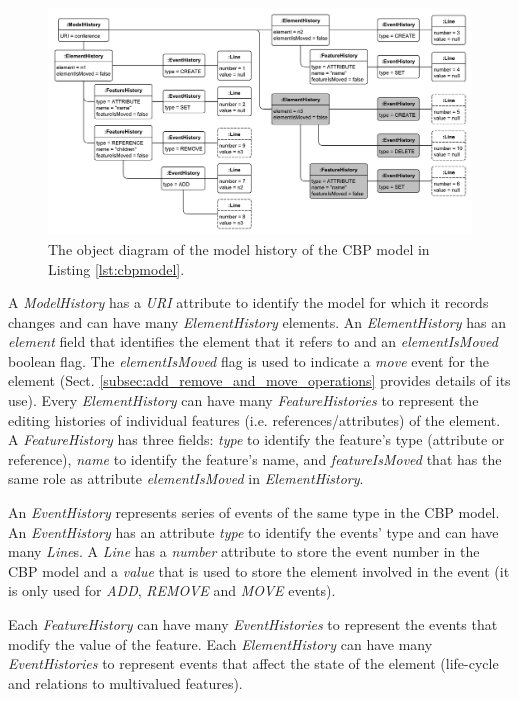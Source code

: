 \documentclass[12pt, a4paper]{report} \usepackage[titletoc]{appendix}
\begin{document}
\begin{figure}[ht]
	\centering
	\includegraphics[width=\linewidth]{history_structure}
	\caption{The object diagram of the model history of the CBP model in Listing \ref{lst:cbpmodel}.}
	\label{fig:history_structure}
\end{figure}

A \emph{ModelHistory} has a \emph{URI} attribute to identify the model for which it records changes and can have many \emph{ElementHistory} elements. An \emph{ElementHistory} has an \emph{element} field that identifies the element that it refers to and an \emph{elementIsMoved} boolean flag. The  \emph{elementIsMoved} flag is used to indicate a \emph{move} event for the element (Sect. \ref{subsec:add_remove_and_move_operations} provides details of its use). Every \emph{ElementHistory} can have many \emph{FeatureHistories} to represent the editing histories of individual features (i.e. references/attributes) of the element.  A \emph{FeatureHistory} has three fields: \emph{type} to identify the feature's type (attribute or reference), \emph{name} to identify the feature's name, and \emph{featureIsMoved} that has the same role as attribute \emph{elementIsMoved} in \emph{ElementHistory}.

An \emph{EventHistory} represents series of events of the same type in the CBP model. An \emph{EventHistory} has an attribute \emph{type} to identify the events' type and can have many \emph{Line}s. A \emph{Line} has a \emph{number} attribute to store the event number in the CBP model and a \emph{value} that is used to store the element involved in the event (it is only used for \emph{ADD}, \emph{REMOVE} and \emph{MOVE} events).

Each \emph{FeatureHistory} can have many \emph{EventHistories} to represent the events that modify the value of the feature. Each \emph{ElementHistory} can have many \emph{EventHistories} to represent events that affect the state of the element (life-cycle and relations to multivalued features).
\end{document}
